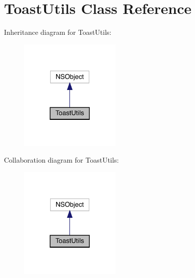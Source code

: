 \hypertarget{interface_toast_utils}{}\section{Toast\+Utils Class Reference}
\label{interface_toast_utils}


Inheritance diagram for Toast\+Utils\+:\nopagebreak
\begin{figure}[H]
\begin{center}
\leavevmode
\includegraphics[width=139pt]{interface_toast_utils__inherit__graph}
\end{center}
\end{figure}


Collaboration diagram for Toast\+Utils\+:\nopagebreak
\begin{figure}[H]
\begin{center}
\leavevmode
\includegraphics[width=139pt]{interface_toast_utils__coll__graph}
\end{center}
\end{figure}
